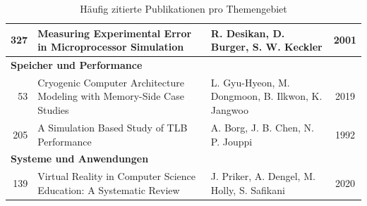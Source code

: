 \begin{table}[htbp]
\begin{tabularx}{\textwidth}{r X l c}
        327 & Measuring Experimental Error in Microprocessor Simulation & R. Desikan, D. Burger, S. W. Keckler & 2001 \\
        \hline
        \multicolumn{4}{l}{\textbf{Speicher und Performance}} \\
        53 & Cryogenic Computer Architecture Modeling with Memory-Side Case Studies & L. Gyu-Hyeon, M. Dongmoon, B. Ilkwon, K. Jangwoo & 2019 \\
        205 & A Simulation Based Study of TLB Performance & A. Borg, J. B. Chen, N. P. Jouppi & 1992 \\
        \hline
        \multicolumn{4}{l}{\textbf{Systeme und Anwendungen}} \\
        139 & Virtual Reality in Computer Science Education: A Systematic Review & J. Priker, A. Dengel, M. Holly, S. Safikani & 2020 \\
        \hline
    \end{tabularx}
    \caption{Häufig zitierte Publikationen pro Themengebiet}
    \label{tab:zitationen}
\end{table}



